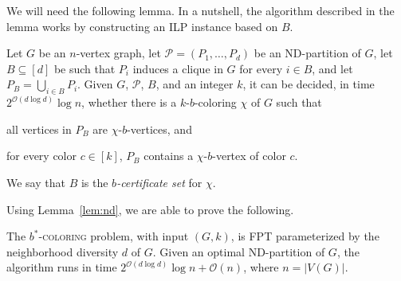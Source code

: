 \documentclass[runningheads, envcountsame]{llncs}
\newcommand{\seq}{\subseteq}
\newcommand{\ca}{\mathcal}
\newcommand{\FPT}{\textsf{FPT}\xspace}
\newcommand{\bscoloring}{$b^*$-\textsc{coloring}\xspace}
\begin{document}
We will need the following lemma. In a nutshell, the algorithm described in the lemma works by constructing an ILP instance based on $B$.

\begin{lemma}\label{lem:nd}
Let $G$ be an $n$-vertex graph, let $\ca P = (P_1, \ldots, P_d)$ be an ND-partition of $G$, let $B \seq [d]$ be such that $P_i$ induces a clique in $G$ for every $i \in B$, and let $P_B = \bigcup_{i\in B} P_i$.
Given $G$, $\ca P$, $B$, and an integer $k$, it can be decided, in time $2^{\ca O(d \log d)} \log n$, whether there is a $k$-$b$-coloring $\chi$ of $G$ such that 
\begin{compactenum}
\item all vertices in $P_B$ are $\chi$-$b$-vertices, and
\item for every color $c \in [k]$, $P_B$ contains a $\chi$-$b$-vertex of color $c$.
\end{compactenum}
We say that $B$ is the \emph{$b$-certificate set} for $\chi$.
\end{lemma}

Using Lemma~\ref{lem:nd}, we are able to prove the following.

\begin{theorem}\label{thm:nd}
The \bscoloring problem, with input $(G, k)$, is \FPT parameterized by the neighborhood diversity $d$ of $G$. Given an optimal ND-partition of $G$, the algorithm runs in time $2^{\ca O(d \log d)} \log n + \ca O(n)$, where $n = |V(G)|$.
\end{theorem}
\end{document}
